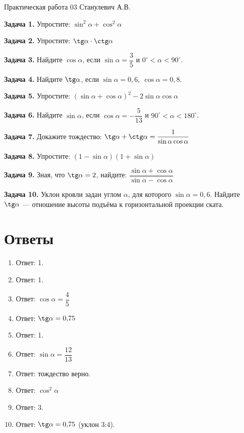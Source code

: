 \documentclass{umk-matematika}
\begin{document}
\maketitlepage
    {Практическая работа 03}
    {}
    {Станулевич А.В.}

\textbf{Задача 1.} Упростите: $\sin^2 \alpha + \cos^2 \alpha$\par\vspace{10pt}
\textbf{Задача 2.} Упростите: $\tg \alpha \cdot \ctg \alpha$\par\vspace{10pt}
\textbf{Задача 3.} Найдите $\cos \alpha$, если $\sin \alpha = \dfrac{3}{5}$ и $0^\circ < \alpha < 90^\circ$.\par\vspace{10pt}
\textbf{Задача 4.} Найдите $\tg \alpha$, если $\sin \alpha = 0{,}6,\ \cos \alpha = 0{,}8$.\par\vspace{10pt}
\textbf{Задача 5.} Упростите: $(\sin \alpha + \cos \alpha)^2 - 2\sin \alpha \cos \alpha$\par\vspace{10pt}
\textbf{Задача 6.} Найдите $\sin \alpha$, если $\cos \alpha = -\dfrac{5}{13}$ и $90^\circ < \alpha < 180^\circ$.\par\vspace{10pt}
\textbf{Задача 7.} Докажите тождество: $\tg \alpha + \ctg \alpha = \dfrac{1}{\sin \alpha \cos \alpha}$\par\vspace{10pt}
\textbf{Задача 8.} Упростите: $(1 - \sin \alpha)(1 + \sin \alpha)$\par\vspace{10pt}
\textbf{Задача 9.} Зная, что $\tg \alpha = 2$, найдите: $\dfrac{\sin \alpha + \cos \alpha}{\sin \alpha - \cos \alpha}$\par\vspace{10pt}
\textbf{Задача 10.} Уклон кровли задан углом $\alpha$, для которого $\sin \alpha = 0{,}6$. Найдите $\tg \alpha$ — отношение высоты подъёма к горизонтальной проекции ската.\par\vspace{10pt}
\newpage
\section*{Ответы}

\begin{enumerate}
  \item Ответ: 1.
  \item Ответ: 1.
  \item Ответ: $\cos \alpha = \dfrac{4}{5}$
  \item Ответ: $\tg \alpha = 0{,}75$
  \item Ответ: 1.
  \item Ответ: $\sin \alpha = \dfrac{12}{13}$
  \item Ответ: тождество верно.
  \item Ответ: $\cos^2 \alpha$
  \item Ответ: 3.
  \item Ответ: $\tg \alpha = 0{,}75$ (уклон 3:4).
\end{enumerate}
\end{document}
